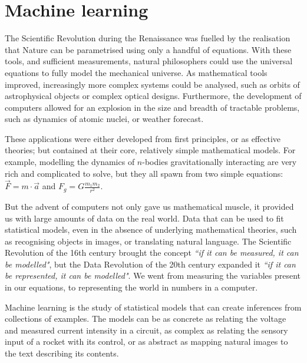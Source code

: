 \chapter{Machine learning}

The Scientific Revolution during the Renaissance 
was fuelled by the realisation that Nature can be parametrised using only a handful of equations.
With these tools, and sufficient measurements, natural philosophers could use the universal equations to fully model the mechanical universe.
As mathematical tools improved, increasingly more complex systems could be analysed, such as orbits of astrophysical objects or complex optical designs.
Furthermore, the development of computers allowed for an explosion in the size and breadth of tractable problems, such as dynamics of atomic nuclei, or weather forecast.

These applications were either developed from first principles, or as effective theories; but contained at their core, relatively simple mathematical models.
For example, modelling the dynamics of $n$-bodies gravitationally interacting are very rich and complicated to solve, but they all spawn from two simple equations: $\vec{F} = m \cdot \vec{a}$  and $F_g=G\frac{m_1  m_2}{r^2}$.

But the advent of computers not only gave us mathematical muscle, it provided us with large amounts of data on the real world.
Data that can be used to fit statistical models, even in the absence of underlying mathematical theories, such as recognising objects in images, or translating natural language.
The Scientific Revolution of the 16th century brought the concept \emph{``if it can be measured, it can be modelled"}, but the Data Revolution of the 20th century expanded it \emph{``if it can be \emph{represented}, it can be modelled"}.
We went from measuring the variables present in our equations, to representing the world in numbers in a computer.

Machine learning 
is the study of statistical models that can create inferences from collections of examples. 
The models can be as concrete as relating the voltage and measured current intensity in a circuit, as complex as relating the sensory input of a rocket with its control, or as abstract as mapping natural images to the text describing its contents.

